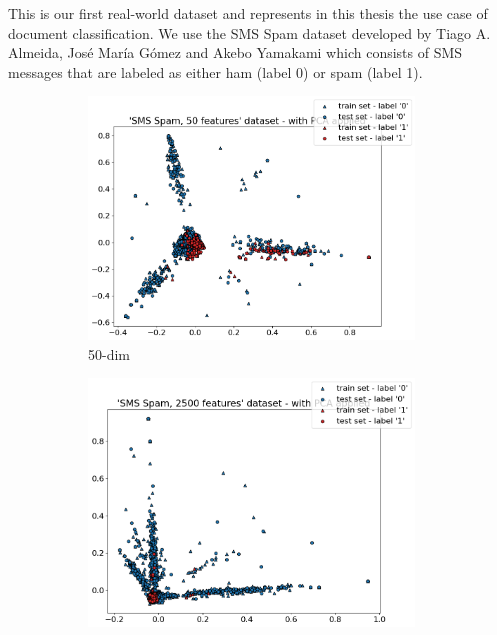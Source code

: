 This is our first real-world dataset and represents in this thesis the use case of document classification. We use the SMS Spam dataset developed by Tiago A. Almeida, José María Gómez and Akebo Yamakami \cite{almeida_contributions_2011} which consists of SMS messages that are labeled as either ham (label 0) or spam (label 1).

\begin{figure}[h]
    \centering
    \begin{subfigure}[t]{0.32\textwidth}
        \centering
        \includegraphics[width=0.95\textwidth]{figures/'SMS Spam, 50 features' dataset - with PCA applied.png}
        \caption{50-dim}
    \end{subfigure}
    \begin{subfigure}[t]{0.32\textwidth}
        \centering
        \includegraphics[width=0.95\textwidth]{figures/'SMS Spam, 2500 features' dataset - with PCA applied.png}

\end{subfigure}
\end{figure}
